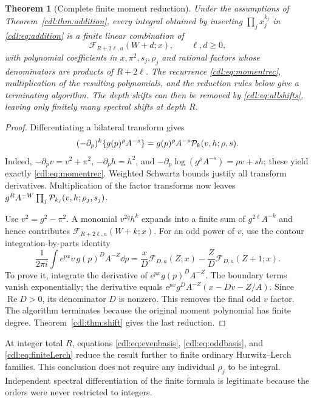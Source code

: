 \documentclass[11pt,letterpaper]{article}
\numberwithin{equation}{section}
\newtheorem{theorem}{Theorem}[section]
\theoremstyle{definition}\newtheorem{definition}[theorem]{Definition}
\theoremstyle{remark}\newtheorem{remark}[theorem]{Remark}
\newcommand{\Rea}{\operatorname{Re}}\newcommand{\Ima}{\operatorname{Im}}
\newcommand{\F}{\mathcal F}\newcommand{\E}{\mathcal E}
\begin{document}
\begin{theorem}[Complete finite moment reduction]\label{cdl:thm:moments}
Under the assumptions of Theorem~\ref{cdl:thm:addition}, every integral
obtained by inserting $\prod_jx_j^{k_j}$ in \eqref{cdl:eq:addition}
is a finite linear combination of
\begin{equation}\label{cdl:eq:momentbasis}
 \F_{R+2\ell,a}(W+d;x),\qquad \ell,d\ge0,
\end{equation}
with polynomial coefficients in $x,\pi^2,s_j,\rho_j$ and rational
factors whose denominators are products of $R+2\ell$.
The recurrence \eqref{cdl:eq:momentrec}, multiplication of the resulting
polynomials, and the reduction rules below give a terminating algorithm.
The depth shifts can then be removed by \eqref{cdl:eq:allshifts}, leaving
only finitely many spectral shifts at depth $R$.
\end{theorem}
\begin{proof}
Differentiating a bilateral transform gives
\[
 (-\partial_p)^k\{g(p)^\rho A^{-s}\}
 =g(p)^\rho A^{-s}\mathcal P_k(v,h;\rho,s).
\]
Indeed, $-\partial_p v=v^2+\pi^2$, $-\partial_p h=h^2$, and
$-\partial_p\log(g^\rho A^{-s})=\rho v+sh$; these yield exactly
\eqref{cdl:eq:momentrec}. Weighted Schwartz bounds justify all transform
derivatives. Multiplication of the factor transforms now leaves
$g^R A^{-W}\prod_j\mathcal P_{k_j}(v,h;\rho_j,s_j)$.

Use $v^2=g^2-\pi^2$. A monomial $v^{2q}h^k$ expands into a finite sum
of $g^{2\ell}A^{-k}$ and hence contributes
$\F_{R+2\ell,a}(W+k;x)$. For an odd power of $v$, use the contour
integration-by-parts identity
\begin{equation}\label{cdl:eq:oddreduction}
 \frac1{2\pi i}\int e^{px}v\,g(p)^D A^{-Z}\dd p
 =\frac{x}{D}\F_{D,a}(Z;x)-\frac ZD\F_{D,a}(Z+1;x).
\end{equation}
To prove it, integrate the derivative of $e^{px}g(p)^D A^{-Z}$.
The boundary terms vanish exponentially; the derivative equals
$e^{px}g^DA^{-Z}(x-Dv-Z/A)$. Since $\Rea D>0$, its denominator
$D$ is nonzero. This removes the final odd $v$ factor. The algorithm
terminates because the original moment polynomial has finite degree.
Theorem~\ref{cdl:thm:shift} gives the last reduction.
\end{proof}

At integer total $R$, equations \eqref{cdl:eq:evenbasis},
\eqref{cdl:eq:oddbasis}, and \eqref{cdl:eq:finiteLerch} reduce the result
further to finite ordinary Hurwitz--Lerch families. This conclusion does
not require any individual $\rho_j$ to be integral. Independent spectral
differentiation of the finite formula is legitimate because the orders
were never restricted to integers.
\end{document}
